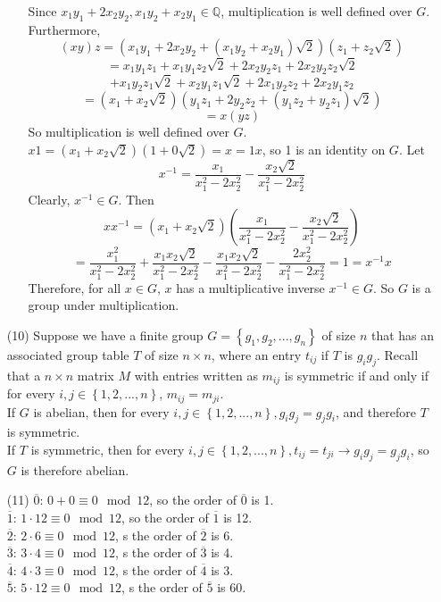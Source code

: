 \documentclass[12pt]{article}
\begin{document}
\begin{itemize}
\begin{itemize}
Since $x_1y_1 + 2x_2y_2, x_1y_2 + x_2y_1 \in \mathbb{Q}$, multiplication is well defined over $G$. Furthermore,
$$(xy)z = (x_1y_1 + 2x_2y_2 + (x_1y_2 + x_2y_1)\sqrt{2})(z_1 + z_2\sqrt{2})$$
$$= x_1y_1z_1 + x_1y_1z_2\sqrt{2} + 2x_2y_2z_1 + 2x_2y_2z_2\sqrt{2}$$
$$+ x_1y_2z_1\sqrt{2} + x_2y_1z_1\sqrt{2} + 2x_1y_2z_2 + 2x_2y_1z_2$$
$$= (x_1 + x_2\sqrt{2})(y_1z_1 + 2y_2z_2 + (y_1z_2 + y_2z_1)\sqrt{2})$$
$$= x(yz)$$
So multiplication is well defined over $G$. $x1 = (x_1 + x_2\sqrt{2})(1 + 0\sqrt{2}) = x = 1x$, so 1 is an identity on $G$. Let 
$$x^{-1} = \frac{x_1}{x_1^2 - 2x_2^2} - \frac{x_2\sqrt{2}}{x_1^2 - 2x_2^2}$$
Clearly, $x^{-1} \in G$. Then
$$xx^{-1} = (x_1 + x_2\sqrt{2})\left(\frac{x_1}{x_1^2 - 2x_2^2} - \frac{x_2\sqrt{2}}{x_1^2 - 2x_2^2} \right)$$
$$= \frac{x_1^2}{x_1^2 - 2x_2^2} + \frac{x_1x_2\sqrt{2}}{x_1^2 - 2x_2^2} - \frac{x_1x_2\sqrt{2}}{x_1^2 - 2x_2^2} - \frac{2x_2^2}{x_1^2 - 2x_2^2} = 1 = x^{-1}x$$
Therefore, for all $x \in G$, $x$ has a multiplicative inverse $x^{-1} \in G$. So $G$ is a group under multiplication. 
\end{itemize}
\item[(10)]
Suppose we have a finite group $G = \left\lbrace g_1, g_2, ..., g_n\right\rbrace$ of size $n$ that has an associated group table $T$ of size $n \times n$, where an entry $t_{ij}$ if $T$ is $g_ig_j$. Recall that a $n \times n$ matrix $M$ with entries written as $m_{ij}$ is symmetric if and only if for every $i,j \in \left\lbrace 1, 2, ..., n \right\rbrace$, $m_{ij} = m_{ji}$. \\
If $G$ is abelian, then for every $i, j \in \left\lbrace 1, 2, ..., n \right\rbrace, g_ig_j = g_jg_i$, and therefore $T$ is symmetric. \\
If $T$ is symmetric, then for every $i, j \in \left\lbrace 1, 2, ..., n \right\rbrace, t_{ij} = t_{ji} \rightarrow g_ig_j = g_jg_i$, so $G$ is therefore abelian.
\item[(11)]
$\overline{0}$: $0 + 0 \equiv 0 \mod 12$, so the order of $\overline{0}$ is 1. \\
$\overline{1}$: $1 \cdot 12 \equiv 0 \mod 12$, so the order of $\overline{1}$ is 12. \\
$\overline{2}$: $2 \cdot 6 \equiv 0 \mod 12$, s the order of $\overline{2}$ is 6. \\
$\overline{3}$: $3 \cdot 4 \equiv 0 \mod 12$, s the order of $\overline{3}$ is 4. \\
$\overline{4}$: $4 \cdot 3 \equiv 0 \mod 12$, s the order of $\overline{4}$ is 3. \\
$\overline{5}$: $5 \cdot 12 \equiv 0 \mod 12$, s the order of $\overline{5}$ is 60. \\

\end{itemize}
\end{document}
